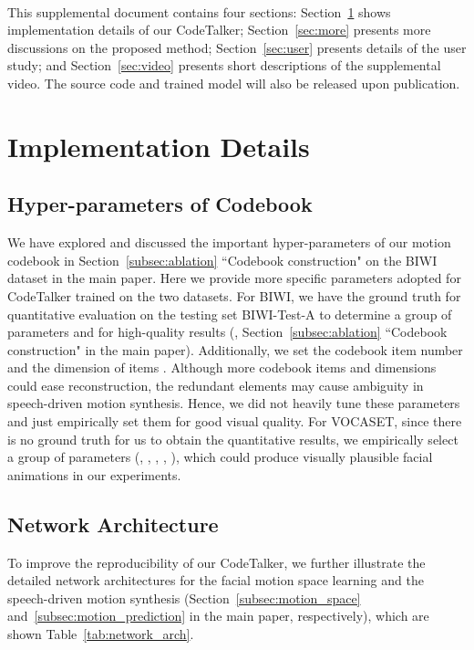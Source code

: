 

\appendix



\vspace{0.2mm}
\\

This supplemental document contains four sections: Section~\ref{sec:implementation} shows implementation details of our CodeTalker; Section~\ref{sec:more} presents more discussions on the proposed method; Section~\ref{sec:user} presents details of the user study; and Section~\ref{sec:video} presents short descriptions of the supplemental video. The source code and trained model will also be released upon publication.


\section{Implementation Details}
\label{sec:implementation}
\subsection{{Hyper-parameters of Codebook}}
We have explored and discussed the important hyper-parameters of our motion codebook in Section~\ref{subsec:ablation} ``Codebook construction" on the BIWI dataset in the main paper. Here we provide more specific parameters adopted for CodeTalker trained on the two datasets. For BIWI, we have the ground truth for quantitative evaluation on the testing set BIWI-Test-A to determine a group of parameters  and  for high-quality results (\ie, Section~\ref{subsec:ablation} ``Codebook construction" in the main paper). Additionally, we set the codebook item number  and the dimension of items . Although more codebook items and dimensions could ease reconstruction, the redundant elements may cause ambiguity in speech-driven motion synthesis. Hence, we did not heavily tune these parameters and just empirically set them for good visual quality. For VOCASET, since there is no ground truth for us to obtain the quantitative results, we empirically select a group of parameters (\ie, , , , ), which could produce visually plausible facial animations in our experiments.

\subsection{Network Architecture}
To improve the reproducibility of our CodeTalker, we further illustrate the detailed network architectures for the facial motion space learning and the speech-driven motion synthesis (Section~\ref{subsec:motion_space} and~\ref{subsec:motion_prediction} in the main paper, respectively), which are shown Table~\ref{tab:network_arch}.


